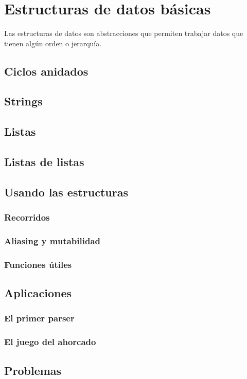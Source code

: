 \chapter{Estructuras de datos básicas}

Las estructuras de datos son abstracciones que permiten trabajar datos que tienen algún orden o jerarquía.


\section{Ciclos anidados}
\section{Strings}
\section{Listas}
\section{Listas de listas}
\section{Usando las estructuras}
\subsection{Recorridos}
\subsection{Aliasing y mutabilidad}
\subsection{Funciones útiles}
\section{Aplicaciones}
\subsection{El primer parser}
\subsection{El juego del ahorcado}
\section{Problemas}

